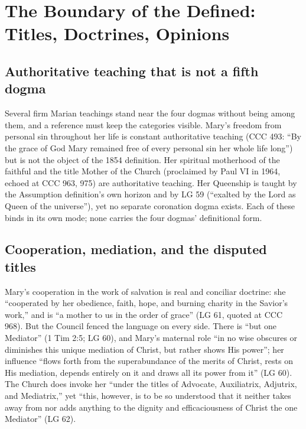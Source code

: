 \sectionguard
\section{The Boundary of the Defined: Titles, Doctrines, Opinions}

\subsection*{Authoritative teaching that is not a fifth dogma}

Several firm Marian teachings stand near the four dogmas without being
among them, and a reference must keep the categories visible. Mary's
freedom from personal sin throughout her life is constant authoritative
teaching (CCC 493: ``By the grace of God Mary remained free of every
personal sin her whole life long'') but is not the object of the 1854
definition. Her spiritual motherhood of the faithful and the title
Mother of the Church (proclaimed by Paul VI in 1964, echoed at CCC 963,
975) are authoritative teaching. Her Queenship is taught by the
Assumption definition's own horizon and by LG 59 (``exalted by the Lord
as Queen of the universe''), yet no separate coronation dogma exists.
Each of these binds in its own mode; none carries the four dogmas'
definitional form.

\subsection*{Cooperation, mediation, and the disputed titles}

Mary's cooperation in the work of salvation is real and conciliar
doctrine: she ``cooperated by her obedience, faith, hope, and burning
charity in the Savior's work,'' and is ``a mother to us in the order of
grace'' (LG 61, quoted at CCC 968). But the Council fenced the language
on every side. There is ``but one Mediator'' (1 Tim 2:5; LG 60), and
Mary's maternal role ``in no wise obscures or diminishes this unique
mediation of Christ, but rather shows His power''; her influence
``flows forth from the superabundance of the merits of Christ, rests on
His mediation, depends entirely on it and draws all its power from it''
(LG 60). The Church does invoke her ``under the titles of Advocate,
Auxiliatrix, Adjutrix, and Mediatrix,'' yet ``this, however, is to be so
understood that it neither takes away from nor adds anything to the
dignity and efficaciousness of Christ the one Mediator'' (LG
62).

